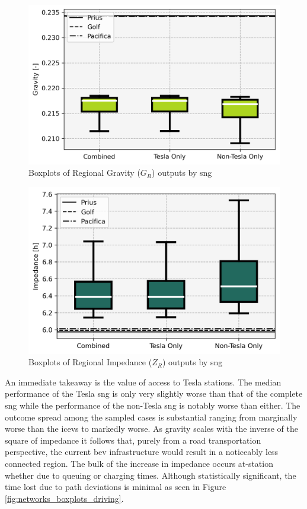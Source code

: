 \begin{multicols}{2}
\begin{figure}[H]
	\centering
	\includegraphics[width = \linewidth]{figs/Networks_Boxplots_Gravity.png}
	\caption{Boxplots of Regional Gravity ($G_R$) outputs by \gls{sng}}
	\label{fig:networks_boxplots_gravity}
\end{figure}

\begin{figure}[H]
	\centering
	\includegraphics[width = \linewidth]{figs/Networks_Boxplots_Impedance.png}
	\caption{Boxplots of Regional Impedance ($Z_R$) outputs by \gls{sng}}
	\label{fig:networks_boxplots_impedance}
\end{figure}

An immediate takeaway is the value of access to Tesla stations. The median performance of the Tesla \gls{sng} is only very slightly worse than that of the complete \gls{sng} while the performance of the non-Tesla \gls{sng} is notably worse than either. The outcome spread among the sampled cases is substantial ranging from marginally worse than the \glspl{icev} to markedly worse. As gravity scales with the inverse of the square of impedance it follows that, purely from a road transportation perspective, the current \gls{bev} infrastructure would result in a noticeably less connected region. The bulk of the increase in impedance occurs at-station whether due to queuing or charging times. Although statistically significant, the time lost due to path deviations is minimal as seen in Figure \ref{fig:networks_boxplots_driving}.


\end{multicols}
